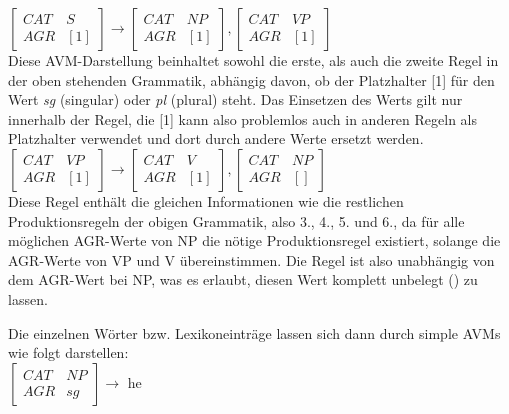 \documentclass[12pt]{report}
\begin{document}
$\begin{bmatrix} 
CAT & S \\
AGR & [1]
\end{bmatrix} 
\rightarrow
\begin{bmatrix} 
CAT & NP \\
AGR & [1]
\end{bmatrix},
\begin{bmatrix} 
CAT & VP \\
AGR & [1] 
\end{bmatrix}$ \\

Diese AVM-Darstellung beinhaltet sowohl die erste, als auch die zweite Regel in der oben stehenden Grammatik, abhängig davon, ob der Platzhalter [1] für den Wert \textit{\glqq  sg\grqq{}} (singular) oder \textit{\glqq  pl\grqq{}} (plural) steht. Das Einsetzen des Werts gilt nur innerhalb der Regel, die [1] kann also problemlos auch in anderen Regeln als Platzhalter verwendet und dort durch andere Werte ersetzt werden.\\

$\begin{bmatrix} 
CAT & VP \\
AGR & [1]
\end{bmatrix} 
\rightarrow
\begin{bmatrix} 
CAT & V \\
AGR & [1]
\end{bmatrix},
\begin{bmatrix} 
CAT & NP \\
AGR & [] 
\end{bmatrix}$ \\

Diese Regel enthält die gleichen Informationen wie die restlichen Produktionsregeln der obigen Grammatik, also 3., 4., 5. und 6., da für alle möglichen AGR-Werte von NP die nötige Produktionsregel existiert, solange die AGR-Werte von VP und V übereinstimmen. Die Regel ist also unabhängig von dem AGR-Wert bei NP, was es erlaubt, diesen Wert komplett unbelegt (\glqq  []\grqq{}) zu lassen.

Die einzelnen Wörter bzw. Lexikoneinträge lassen sich dann durch simple AVMs wie folgt darstellen:\\

$\begin{bmatrix} 
CAT & NP \\
AGR & sg
\end{bmatrix}\rightarrow$ he \\
\end{document}

